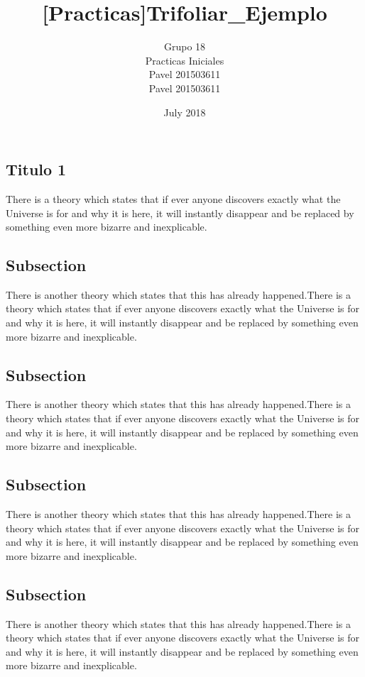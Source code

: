\documentclass{article}
\title{[Practicas]Trifoliar_Ejemplo}
\author{Grupo 18 \\Practicas Iniciales\\Pavel 201503611\\Pavel 201503611}
\date{July 2018}
\begin{document}
\maketitle{}
\setlength{\columnsep}{8mm}
\begin{multicols}{3} 	  
\tableofcontents
\pagecolor{color3}

\section{Titulo 1}
There is a theory which states that if ever anyone discovers exactly what the Universe is for and why it is here, it will instantly disappear and be replaced by something even more bizarre and inexplicable.

\subsection{Subsection}
There is another theory which states that this has already happened.There is a theory which states that if ever anyone discovers exactly what the Universe is for and why it is here, it will instantly disappear and be replaced by something even more bizarre and inexplicable.
\subsection{Subsection}
There is another theory which states that this has already happened.There is a theory which states that if ever anyone discovers exactly what the Universe is for and why it is here, it will instantly disappear and be replaced by something even more bizarre and inexplicable.
\subsection{Subsection}
There is another theory which states that this has already happened.There is a theory which states that if ever anyone discovers exactly what the Universe is for and why it is here, it will instantly disappear and be replaced by something even more bizarre and inexplicable.
\subsection{Subsection}
There is another theory which states that this has already happened.There is a theory which states that if ever anyone discovers exactly what the Universe is for and why it is here, it will instantly disappear and be replaced by something even more bizarre and inexplicable.

\end{multicols}
\end{document}
